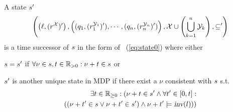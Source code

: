 \begin{definition}
A state $s'$ 
\begin{equation}\label{eq:state1}
    \left (
        \left (
            \ell,(r^{\mathcal{X}})'
        \right )
        ,
        \left (
            (q_1,(r_1^{\mathcal{Y}_1})'),
            \cdots,
            (q_n,(r_n^{\mathcal{Y}_n})')
        \right )
        ,
        \mathcal{X} \cup \left(
            \bigcup_{k=1}^{n} \mathcal{Y}_k
        \right )
        ,
        \subseteq'
    \right )
\end{equation} 
is a time successor of $s$ in the 
form of ~(\ref{eq:state0}) where either 
\begin{compactitem}
    \item 
        $s = s'$ if 
        $
            \forall \nu \in s, t \in \mathbb{R}_{>0} : \nu + t \in s
        $ or
    \item 
        $s'$ is another unique state in MDP if
        there exist a $\nu$ consistent with $s$ s.t.
        \begin{align*}
            \exists t \in \mathbb{R}_{\ge0} : (
                \nu + t \in s' 
                \land
                \forall t' \in [0,t] : \\ \left (
                    \left (
                        \nu + t' \in s
                        \lor
                        \nu + t' \in s'
                    \right )
                    \land
                    \nu + t' \models \mbox{\sl inv}(l)
                \right )
            )
        \end{align*}
\end{compactitem}
\end{definition}

